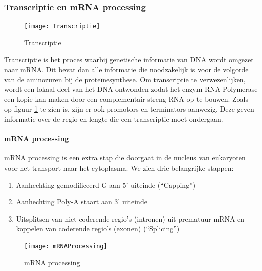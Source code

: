 \documentclass[a4paper,kul]{kulakarticle} %
\begin{document}
\subsubsection{Transcriptie en mRNA processing}
\begin{figure}[h]
	\centering
	\texttt{[image: Transcriptie]}
	\caption[Transcriptie]{Transcriptie}
	\label{fig:transcriptie}
\end{figure}

Transcriptie is het proces waarbij genetische informatie van DNA wordt omgezet naar mRNA. Dit bevat dan alle informatie die noodzakelijk is voor de volgorde van de aminozuren bij de proteïnesynthese. Om transcriptie te verwezenlijken, wordt een lokaal deel van het DNA ontwonden zodat het enzym RNA Polymerase een kopie kan maken door een complementair streng RNA op te bouwen. Zoals op figuur \ref{fig:transcriptie} te zien is, zijn er ook promotors en terminators aanwezig. Deze geven informatie over de regio en lengte die een transcriptie moet ondergaan. 
\newpage
\paragraph{mRNA processing}
mRNA processing is een extra stap die doorgaat in de nucleus van eukaryoten voor het transport naar het cytoplasma. We zien drie belangrijke stappen:
\begin{enumerate}
	\item Aanhechting gemodificeerd G aan 5’ uiteinde (“Capping”)
	\item Aanhechting Poly-A staart aan 3’ uiteinde
	\item Uitsplitsen van niet-coderende regio’s (intronen) uit prematuur mRNA en
	koppelen van coderende regio’s (exonen) (“Splicing”) 
\end{enumerate}
\begin{figure}[h]
	\centering
	\texttt{[image: mRNAProcessing]}
	\caption[mRNA processing]{mRNA processing}
	\label{fig:mrnaprocessing}
\end{figure}
\newpage
\end{document}
